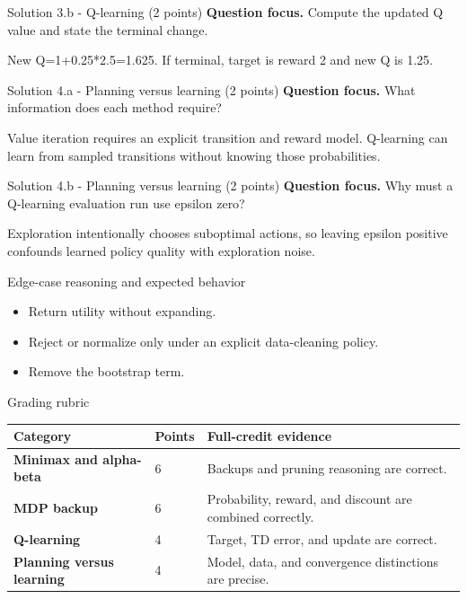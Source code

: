 \documentclass[aspectratio=169,11pt]{beamer}
\begin{document}
\begin{frame}{Solution 3.b - Q-learning (2 points)}
\small
\textbf{Question focus.} Compute the updated Q value and state the terminal change.

\vspace{0.25cm}
\answerlabel New Q=1+0.25*2.5=1.625. If terminal, target is reward 2 and new Q is 1.25.
\end{frame}

\begin{frame}{Solution 4.a - Planning versus learning (2 points)}
\small
\textbf{Question focus.} What information does each method require?

\vspace{0.25cm}
\answerlabel Value iteration requires an explicit transition and reward model. Q-learning can learn from sampled transitions without knowing those probabilities.
\end{frame}

\begin{frame}{Solution 4.b - Planning versus learning (2 points)}
\small
\textbf{Question focus.} Why must a Q-learning evaluation run use epsilon zero?

\vspace{0.25cm}
\answerlabel Exploration intentionally chooses suboptimal actions, so leaving epsilon positive confounds learned policy quality with exploration noise.
\end{frame}

\begin{frame}{Edge-case reasoning and expected behavior}
\small
\begin{itemize}
  \item Return utility without expanding.
  \item Reject or normalize only under an explicit data-cleaning policy.
  \item Remove the bootstrap term.
\end{itemize}
\end{frame}

\begin{frame}{Grading rubric}
\scriptsize
\begin{tabularx}{\textwidth}{>{\bfseries}p{} p{} X}
\toprule
Category & Points & Full-credit evidence \\
\midrule
Minimax and alpha-beta & 6 & Backups and pruning reasoning are correct. \\
MDP backup & 6 & Probability, reward, and discount are combined correctly. \\
Q-learning & 4 & Target, TD error, and update are correct. \\
Planning versus learning & 4 & Model, data, and convergence distinctions are precise. \\
\bottomrule
\end{tabularx}
\end{frame}
\end{document}
